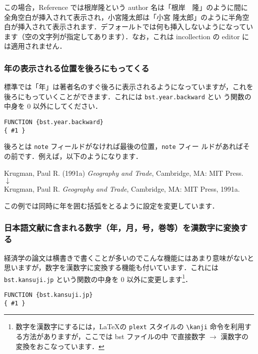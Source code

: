 \documentclass[a4j,10pt]{jarticle}
\begin{document}
この場合，Reference では根岸隆という author 名は「根岸　隆」のように間に
全角空白が挿入されて表示され，小宮隆太郎は「小宮 隆太郎」のように半角空
白が挿入されて表示されます．デフォールトでは何も挿入しないようになってい
ます（空の文字列が指定してあります）．なお，これは incollection の editor 
には適用されません．

\subsubsection{年の表示される位置を後ろにもってくる}

標準では「年」は著者名のすぐ後ろに表示されるようになっていますが，これを
後ろにもっていくことができます．これには \texttt{bst.year.backward} とい
う関数の中身を 0 以外にしてください．
\begin{screen}
\begin{verbatim}
FUNCTION {bst.year.backward}
{ #1 }
\end{verbatim}
\end{screen}

後ろとは \texttt{note} フィールドがなければ最後の位置，\texttt{note} フィー
ルドがあればその前です．例えば，以下のようになります．
\begin{center}
 Krugman, Paul R. (1991a) \textit{Geography and Trade}, Cambridge, MA:
 MIT Press. \\
 $\downarrow$ \\
 Krugman, Paul R. \textit{Geography and Trade}, Cambridge, MA: MIT Press, 1991a.
\end{center}
この例では同時に年を囲む括弧をとるように設定を変更しています．

\subsubsection{日本語文献に含まれる数字（年，月，号，巻等）を漢数字に変換する}

経済学の論文は横書きで書くことが多いのでこんな機能にはあまり意味がないと
思いますが，数字を漢数字に変換する機能も付いています．これには 
\texttt{bst.kansuji.jp} という関数の中身を 0 以外に変更します\footnote
{数字を漢数字にするには，\LaTeX の \texttt{plext} スタイルの 
\verb|\kanji| 命令を利用する方法がありますが，ここでは bst ファイルの中
で直接数字 $\rightarrow$ 漢数字の変換をおこなっています．}．
\begin{screen}
\begin{verbatim}
FUNCTION {bst.kansuji.jp}
{ #1 }
\end{verbatim}
\end{screen}
\end{document}

